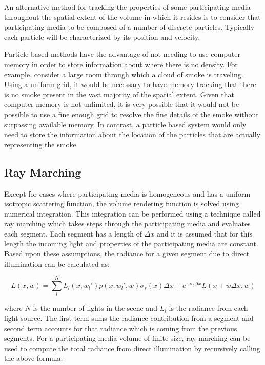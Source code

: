 \documentclass{article}
\begin{document}
An alternative method for tracking the properties of some participating media throughout the spatial extent of the volume in which it resides is to consider that participating media to be composed of a number of discrete particles. Typically each particle will be characterized by its position and velocity.

Particle based methods have the advantage of not needing to use computer memory in order to store information about where there is no density. For example, consider a large room through which a cloud of smoke is traveling. Using a uniform grid, it would be necessary to have memory tracking that there is no smoke present in the vast majority of the spatial extent. Given that computer memory is not unlimited, it is very possible that it would not be possible to use a fine enough grid to resolve the fine details of the smoke without surpassing available memory. In contrast, a particle based system would only need to store the information about the location of the particles that are actually representing the smoke.

\subsection{Ray Marching}

Except for cases where participating media is homogeneous and has a uniform isotropic scattering function, the volume rendering function is solved using numerical integration. This integration can be performed using a technique called ray marching\cite{Levoy:1990:ERT:78964.78965} which takes steps through the participating media and evaluates each segment. Each segment has a length of $\Delta x$ and it is assumed that for this length the incoming light and properties of the participating media are constant. Based upon these assumptions, the radiance for a given segment due to direct illumination can be calculated as:

\begin{equation}
L(x, w) = \displaystyle\sum_{l}^{N}L_{l}(x,w_{l}')p(x,w_{l}',w)\sigma_{s}(x)\Delta x + e^{-\sigma_{t}\Delta x}L(x + w\Delta x,w)
\end{equation}

where $N$ is the number of lights in the scene and $L_{l}$ is the radiance from each light source. The first term sums the radiance contribution from a segment and second term accounts for that radiance which is coming from the previous segments. For a participating media volume of finite size, ray marching can be used to compute the total radiance from direct illumination by recursively calling the above formula:
\end{document}
